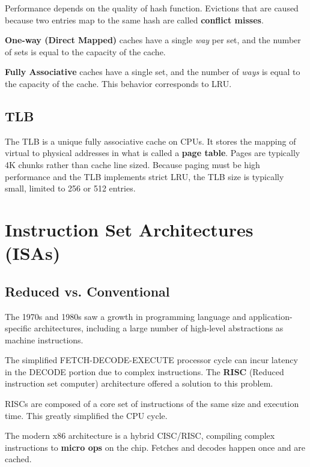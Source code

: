 \documentclass[twoside]{article}
\begin{document}
Performance depends on the quality of hash function. Evictions that are caused
because two entries map to the same hash are called \textbf{conflict misses}.

\textbf{One-way (Direct Mapped)} caches have a single \emph{way} per set, and
the number of sets is equal to the capacity of the cache.

\textbf{Fully Associative} caches have a single set, and the number of
\emph{ways} is equal to the capacity of the cache. This behavior corresponds to
LRU.

\subsection{TLB}

The TLB is a unique fully associative cache on CPUs. It stores the mapping of
virtual to physical addresses in what is called a \textbf{page table}. Pages are
typically 4K chunks rather than cache line sized. Because paging must be high
performance and the TLB implements strict LRU, the TLB size is typically small,
limited to 256 or 512 entries.

\section{Instruction Set Architectures (ISAs)}

\subsection{Reduced vs. Conventional}

The 1970s and 1980s saw a growth in programming language and
application-specific architectures, including a large number of high-level
abstractions as machine instructions.

The simplified FETCH-DECODE-EXECUTE processor cycle can incur latency in the
DECODE portion due to complex instructions. The \textbf{RISC} (Reduced instruction
set computer) architecture offered a solution to this problem.

RISCs are composed of a core set of instructions of the same size and execution
time. This greatly simplified the CPU cycle.

The modern x86 architecture is a hybrid CISC/RISC, compiling complex
instructions to \textbf{micro ops} on the chip. Fetches and decodes happen once
and are cached.
\end{document}
